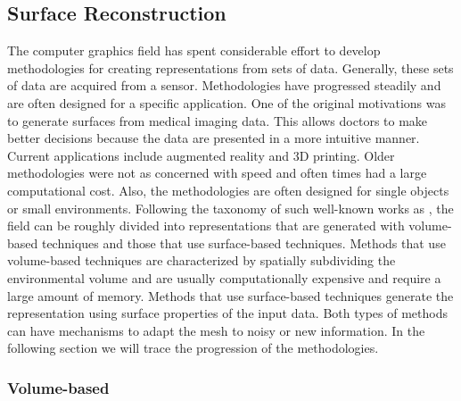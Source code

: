 \documentclass[12pt]{article}
\begin{document}
\subsection{Surface Reconstruction}

The computer graphics field has spent considerable effort to develop methodologies
for creating representations from sets of data. Generally, these sets of
data are acquired from a sensor. Methodologies have progressed steadily and
are often designed for a specific application. One of the original motivations
was to generate surfaces from medical imaging data. This
allows doctors to make better decisions because the data are presented in a
more intuitive manner. Current applications include augmented reality and
3D printing. Older methodologies were not as concerned with speed and often
times had a large computational cost. Also, the methodologies are often
designed for single objects or small environments. Following the taxonomy
of such well-known works as \cite{Gopi2002,Mencl1997}, the field can be
roughly divided into representations that are generated with volume-based
techniques and those that use surface-based techniques. Methods that use
volume-based techniques are characterized by spatially subdividing the
environmental volume and are usually computationally expensive and require
a large amount of memory. Methods that use surface-based techniques
generate the representation using surface properties of the input data.
Both types of methods can have mechanisms to adapt the mesh to noisy or new
information.  In the following section we will trace the progression of the
methodologies. 
 
\subsubsection{Volume-based}
\end{document}
